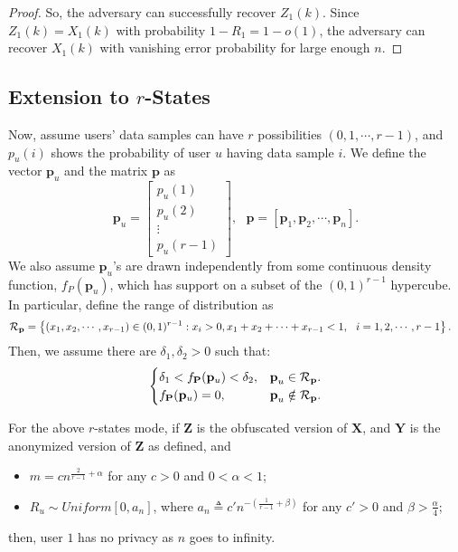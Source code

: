 \begin{proof}
So, the adversary can successfully recover $Z_1(k)$. Since $Z_{1}(k)=X_1(k)$ with probability $1-R_1=1-o(1)$, the adversary can recover $X_{1}(k)$ with vanishing error probability for large enough $n$.
\end{proof}

\subsection{Extension to $r$-States}
Now, assume users' data samples can have $r$ possibilities $\left(0, 1, \cdots, r-1\right)$, and $p_u(i)$ shows the probability of user $u$ having data sample $i$. We define the vector $\textbf{p}_u$ and the matrix $\textbf{p}$ as
\[\textbf{p}_u= \begin{bmatrix}
p_u(1) \\ p_u(2) \\ \vdots \\p_u(r-1) \end{bmatrix} , \ \ \  \textbf{p} =\left[ \textbf{p}_{1}, \textbf{p}_{2}, \cdots,  \textbf{p}_{n}\right].
\]
We also assume $\textbf{p}_u$'s are drawn independently from some continuous density function, $f_P(\textbf{p}_u)$, which has support on a subset of the $(0,1)^{r-1}$ hypercube. In particular, define the range of distribution as
\begin{align}
\nonumber  \mathcal{R}_{\textbf{p}} &= \left\{ (x_1, x_2, \cdots, x_{r-1}) \in (0,1)^{r-1}: x_i > 0 , x_1+ x_2+\cdots+ x_{r-1} < 1,\ \ i=1, 2,\cdots, r-1\right\}.
\end{align}
Then, we assume there are $\delta_1, \delta_2>0$ such that:
\begin{equation}
\begin{cases}
\nonumber    \delta_1<f_{\textbf{P}}(\mathbf{p}_u) <\delta_2, & \textbf{p}_u \in \mathcal{R}_{\textbf{p}}.\\
    f_{\textbf{P}}(\mathbf{p}_u)=0, &  \textbf{p}_u \notin \mathcal{R}_{\textbf{p}}.
\end{cases}
\end{equation}

\begin{thm}\label{r_state_thm_converse}
For the above $r$-states mode, if $\textbf{Z}$ is the obfuscated version of $\textbf{X}$, and $\textbf{Y}$ is the anonymized version of $\textbf{Z}$ as defined, and
\begin{itemize}
	\item $m =cn^{\frac{2}{r-1} +  \alpha}$ for any $c>0$ and $0<\alpha<1$;
	\item $R_u \sim Uniform [0, a_n]$, where $a_n \triangleq c'n^{-\left(\frac{1}{r-1}+\beta\right)}$ for any $c'>0$ and $\beta>\frac{\alpha}{4}$;
\end{itemize}
then, user $1$ has no privacy as $n$ goes to infinity. 
\end{thm}


